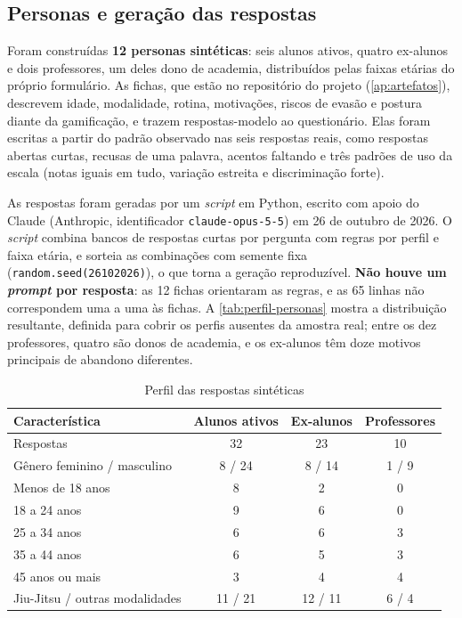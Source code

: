\subsection{Personas e geração das respostas}

Foram construídas \textbf{12 personas sintéticas}: seis alunos ativos,
quatro ex-alunos e dois professores, um deles dono de academia,
distribuídos pelas faixas etárias do próprio formulário. As fichas, que estão
no repositório do projeto (\autoref{ap:artefatos}), descrevem idade, modalidade, rotina, motivações,
riscos de evasão e postura diante da gamificação, e trazem respostas-modelo
ao questionário. Elas foram escritas a partir do padrão observado nas seis
respostas reais, como respostas abertas curtas, recusas de uma palavra,
acentos faltando e três padrões de uso da escala (notas iguais em tudo,
variação estreita e discriminação forte).

As respostas foram geradas por um \textit{script} em Python, escrito com
apoio do Claude (Anthropic, identificador \texttt{claude-opus-5-5}) em
26 de outubro de 2026. O \textit{script} combina bancos de respostas
curtas por pergunta com regras por perfil e faixa etária, e sorteia as
combinações com semente fixa (\texttt{random.seed(26102026)}), o que
torna a geração reproduzível. \textbf{Não houve um \textit{prompt} por
resposta}: as 12 fichas orientaram as regras, e as 65 linhas não
correspondem uma a uma às fichas. A \autoref{tab:perfil-personas} mostra
a distribuição resultante, definida para cobrir os perfis ausentes da
amostra real; entre os dez professores, quatro são donos de academia, e
os ex-alunos têm doze motivos principais de abandono diferentes.

\begin{table}[H]
  \centering
  \caption{Perfil das respostas sintéticas}
  \label{tab:perfil-personas}
  \footnotesize
  \begin{tabular}{lccc}
    \toprule
    \textbf{Característica} & \textbf{Alunos ativos} & \textbf{Ex-alunos} & \textbf{Professores} \\
    \midrule
    Respostas                           & 32 & 23 & 10 \\
    Gênero feminino / masculino         & 8 / 24 & 8 / 14 & 1 / 9 \\
    Menos de 18 anos                    & 8 & 2 & 0 \\
    18 a 24 anos                        & 9 & 6 & 0 \\
    25 a 34 anos                        & 6 & 6 & 3 \\
    35 a 44 anos                        & 6 & 5 & 3 \\
    45 anos ou mais                     & 3 & 4 & 4 \\
    Jiu-Jitsu / outras modalidades      & 11 / 21 & 12 / 11 & 6 / 4 \\
    \bottomrule
  \end{tabular}
\end{table}

